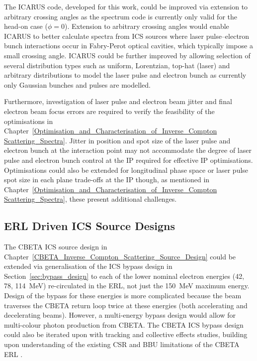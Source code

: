 \documentclass[../main.tex]{subfiles}
\begin{document}
The \textsc{ICARUS} code, developed for this work, could be improved via extension to arbitrary crossing angles as the spectrum code is currently only valid for the head-on case ($\phi=0$). Extension to arbitrary crossing angles would enable \textsc{ICARUS} to better calculate spectra from ICS sources where laser pulse--electron bunch interactions occur in Fabry-Perot optical cavities, which typically impose a small crossing angle. \textsc{ICARUS} could be further improved by allowing selection of several distribution types such as uniform, Lorentzian, top-hat (laser) and arbitrary distributions to model the laser pulse and electron bunch as currently only Gaussian bunches and pulses are modelled.

Furthermore, investigation of laser pulse and electron beam jitter and final electron beam focus errors are required to verify the feasibility of the optimisations in Chapter~\ref{Optimisation_and_Characterisation_of_Inverse_Compton Scattering_Spectra}. Jitter in position and spot size of the laser pulse and electron bunch at the interaction point may not accommodate the degree of laser pulse and electron bunch control at the IP required for effective IP optimisations. Optimisations could also be extended for longitudinal phase space or laser pulse spot size in each plane trade-offs at the IP though, as mentioned in Chapter~\ref{Optimisation_and_Characterisation_of_Inverse_Compton Scattering_Spectra}, these present additional challenges.   

\subsection{ERL Driven ICS Source Designs}

The CBETA ICS source design in Chapter~\ref{CBETA_Inverse_Compton_Scattering_Source_Design} could be extended via generalisation of the ICS bypass design in Section~\ref{sec:bypass_design} to each of the lower nominal electron energies (42, 78, 114~\si{\mega\electronvolt}) re-circulated in the ERL, not just the 150~\si{\mega\electronvolt} maximum energy. Design of the bypass for these energies is more complicated because the beam traverses the CBETA return loop twice at these energies (both accelerating and decelerating beams). However, a multi-energy bypass design would allow for multi-colour photon production from CBETA. The CBETA ICS bypass design could also be iterated upon with tracking and collective effects studies, building upon understanding of the existing CSR and BBU limitations of the CBETA ERL \cite{lou2019beam,lou2020coherent}.
\end{document}
